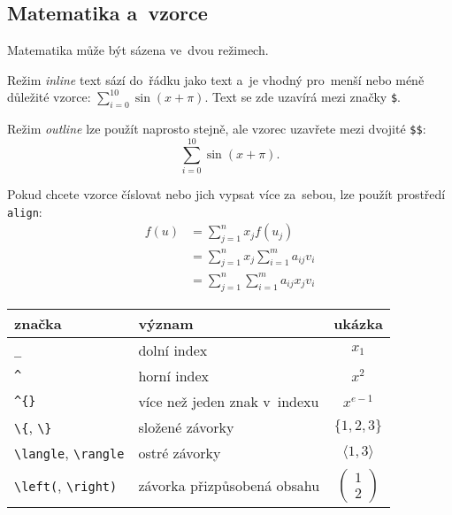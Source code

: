 \subsection{Matematika a~vzorce}

Matematika může být sázena ve~dvou režimech.

Režim \emph{inline} text sází do~řádku jako text a~je vhodný pro~menší nebo méně důležité vzorce:
$\sum_{i=0}^{10} \sin (x + \pi)$.
Text se zde uzavírá mezi značky \verb|$|.

Režim \emph{outline} lze použít naprosto stejně, ale vzorec uzavřete mezi dvojité \verb|$$|:
$$\sum_{i=0}^{10} \sin (x + \pi).$$

Pokud chcete vzorce číslovat nebo jich vypsat více za~sebou, lze použít prostředí \texttt{align}:
\begin{align*}
f(u) & =\sum_{j=1}^{n} x_jf(u_j) \\
     & =\sum_{j=1}^{n} x_j \sum_{i=1}^{m} a_{ij}v_i \\
     & =\sum_{j=1}^{n} \sum_{i=1}^{m} a_{ij}x_jv_i
\end{align*}

\begin{table}[ht]
\centering
\begin{tabular}{|l|l|c|}
značka & význam & ukázka \\
\hline \hline
\texttt{\_} & dolní index & $x_1$ \\
\texttt{\^} & horní index & $x^2$ \\
\verb|^{}|  & více než jeden znak v~indexu & $x^{e-1}$ \\
\verb|\{|, \verb|\}| & složené závorky & $\{1, 2, 3\}$ \\
\verb|\langle|, \verb|\rangle| & ostré závorky & $\langle 1, 3 \rangle$ \\
\verb|\left(|, \verb|\right)| & závorka přizpůsobená obsahu & $\left(\begin{matrix}1\\2\end{matrix}\right)$
\end{tabular}
\end{table}

